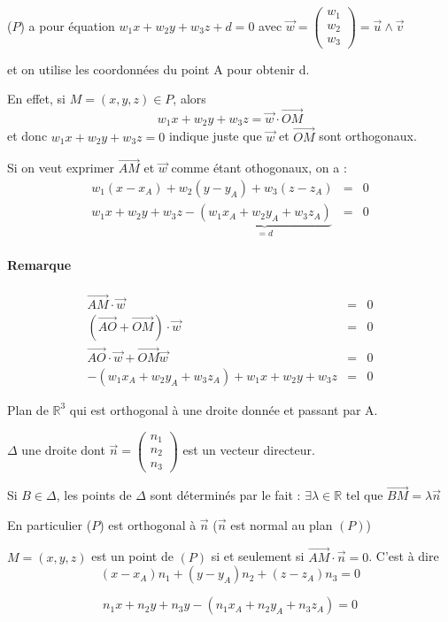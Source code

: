 		 ($P$) a pour équation $w_1 x + w_2 y + w_3 z + d = 0$ avec $\vec{w} = \begin{pmatrix}
			 w_1 \\
			 w_2 \\
		 w_3\end{pmatrix} = \vec{u}\wedge \vec{v}$

		 et on utilise les coordonnées du point A pour obtenir d.

		 En effet, si $M = (x, y, z) \in P$, alors \[w_1 x + w_2 y + w_3 z = \vec{w} \cdot \vec{OM}\]
		 et donc $w_1 x + w_2 y + w_3 z = 0$ indique juste que $\vec{w}$ et $\vec{OM}$ sont orthogonaux.

		 Si on veut exprimer $\vec{AM}$ et $\vec{w}$ comme étant othogonaux, on a :
		 \[\begin{array}{rcl}
			 w_1(x - x_A) + w_2(y-y_A) + w_3(z-z_A) &=& 0 \\
		 w_1x + w_2y + w_3z - \underbrace{(w_1 x_A + w_2 y_A + w_3 z_A)}_{=d} &=& 0 \end{array}\]

		 \paragraph{Remarque}
			\[\begin{array}{rcl}
					\vec{AM}\cdot \vec{w} &=& 0 \\
					(\vec{AO} + \vec{OM})\cdot \vec{w} &=& 0 \\
					\vec{AO} \cdot \vec{w} + \vec{OM} \vec{w} &=& 0 \\
					 -(w_1 x_A + w_2 y_A + w_3 z_A) + w_1x + w_2y + w_3z &=& 0 \end{array}\]

		Plan de $\mathbb{R}^3$ qui est orthogonal à une droite donnée et passant par A.

		$\Delta$ une droite dont $\vec{n} = \begin{pmatrix}
			n_1 \\
			n_2 \\
		n_3\end{pmatrix}$ est un vecteur directeur.

		Si $B \in \Delta$, les points de $\Delta$ sont déterminés par le fait : $\exists \lambda \in \mathbb{R}$ tel que $\vec{BM} = \lambda\vec{n}$

		En particulier ($P$) est orthogonal à $\vec{n}$ ($\vec{n}$ est normal au plan $(P)$)

		$M = (x, y, z)$ est un point de $(P)$ si et seulement si $\vec{AM} \cdot \vec{n} = 0$. C'est à dire \[(x-x_A) n_1 + (y-y_A)n_2 + (z - z_A) n_3 = 0\]

		\[n_1x + n_2y + n_3y - (n_1x_A + n_2y_A + n_3z_A) = 0\]
